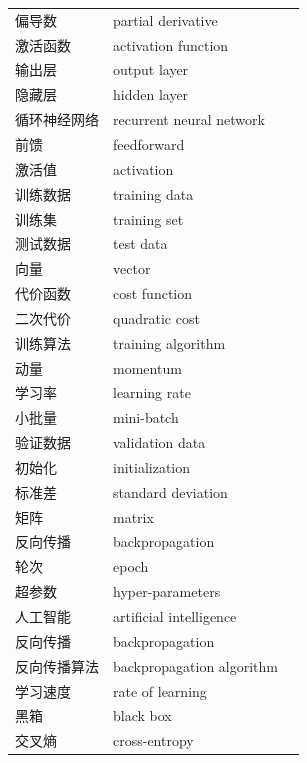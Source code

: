 \begin{longtable}{p{}p{}r}
偏导数 & partial derivative & \pageref{term:21} \\
激活函数 & activation function & \pageref{term:22} \\
输出层 & output layer & \pageref{term:23} \\
隐藏层 & hidden layer & \pageref{term:24} \\
循环神经网络 & recurrent neural network & \pageref{term:25} \\
前馈 & feedforward & \pageref{term:26} \\
激活值 & activation & \pageref{term:27} \\
训练数据 & training data & \pageref{term:28} \\
训练集 & training set & \pageref{term:29} \\
测试数据 & test data & \pageref{term:30} \\
向量 & vector & \pageref{term:31} \\
代价函数 & cost function & \pageref{term:32} \\
二次代价 & quadratic cost & \pageref{term:33} \\
训练算法 & training algorithm & \pageref{term:34} \\
动量 & momentum & \pageref{term:35} \\
学习率 & learning rate & \pageref{term:36} \\
小批量 & mini-batch & \pageref{term:37} \\
验证数据 & validation data & \pageref{term:38} \\
初始化 & initialization & \pageref{term:39} \\
标准差 & standard deviation & \pageref{term:40} \\
矩阵 & matrix & \pageref{term:41} \\
反向传播 & backpropagation & \pageref{term:42} \\
轮次 & epoch & \pageref{term:43} \\
超参数 & hyper-parameters & \pageref{term:44} \\
人工智能 & artificial intelligence & \pageref{term:45} \\
反向传播 & backpropagation & \pageref{term:46} \\
反向传播算法 & backpropagation algorithm & \pageref{term:47} \\
学习速度 & rate of learning & \pageref{term:48} \\
黑箱 & black box & \pageref{term:49} \\
交叉熵 & cross-entropy & \pageref{term:50} \\

\end{longtable}
